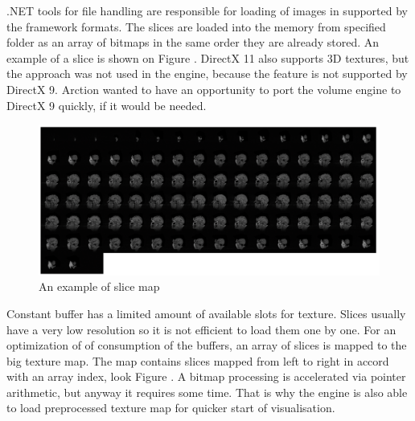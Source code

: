 \documentclass[twoside, english, 11pt]{report}
\begin{document}
.NET tools for file handling are responsible for loading of images in supported by the framework formats. The slices are loaded into the memory from specified folder as an array of bitmaps in the same order they are already stored. An example of a slice is shown on Figure \label{fig:slice}. DirectX 11 also supports 3D textures, but the approach was not used in the engine, because the feature is not supported by DirectX 9. Arction wanted to have an opportunity to port the volume engine to DirectX 9 quickly, if it would be needed. \\

\begin{figure}[!h]
\centerline{\includegraphics[scale = 0.35]{img/map}}
\caption{An example of slice map\label{fig:map}}
\end{figure}
Constant buffer has a limited amount of available slots for texture. Slices usually have a very low resolution so it is not efficient to load them one by one. For an optimization of of consumption of the buffers, an array of slices is mapped to the big texture map. The map contains slices mapped from left to right in accord with an array index, look Figure \label{fig:map}. A bitmap processing is accelerated via pointer arithmetic, but anyway it requires some time. That is why the engine is also able to load preprocessed texture map for quicker start of visualisation. \\
\end{document}
